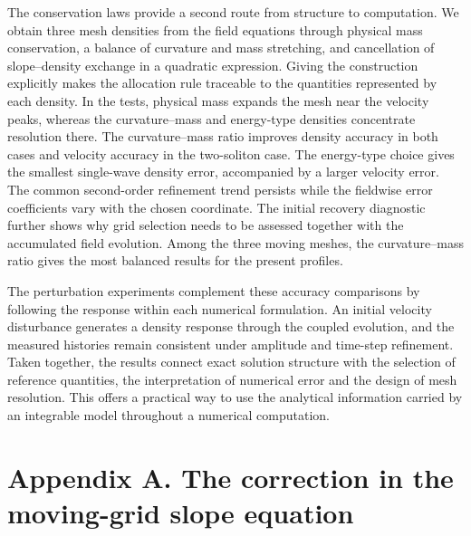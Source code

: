 \documentclass{article}
\begin{document}
The conservation laws provide a second route from structure to computation. We obtain three mesh densities from the field equations through physical mass conservation, a balance of curvature and mass stretching, and cancellation of slope--density exchange in a quadratic expression. Giving the construction explicitly makes the allocation rule traceable to the quantities represented by each density. In the tests, physical mass expands the mesh near the velocity peaks, whereas the curvature--mass and energy-type densities concentrate resolution there. The curvature--mass ratio improves density accuracy in both cases and velocity accuracy in the two-soliton case. The energy-type choice gives the smallest single-wave density error, accompanied by a larger velocity error. The common second-order refinement trend persists while the fieldwise error coefficients vary with the chosen coordinate. The initial recovery diagnostic further shows why grid selection needs to be assessed together with the accumulated field evolution. Among the three moving meshes, the curvature--mass ratio gives the most balanced results for the present profiles.

The perturbation experiments complement these accuracy comparisons by following the response within each numerical formulation. An initial velocity disturbance generates a density response through the coupled evolution, and the measured histories remain consistent under amplitude and time-step refinement. Taken together, the results connect exact solution structure with the selection of reference quantities, the interpretation of numerical error and the design of mesh resolution. This offers a practical way to use the analytical information carried by an integrable model throughout a numerical computation.


\section*{Appendix A. The correction in the moving-grid slope equation}
\label{app:correction}
\end{document}
